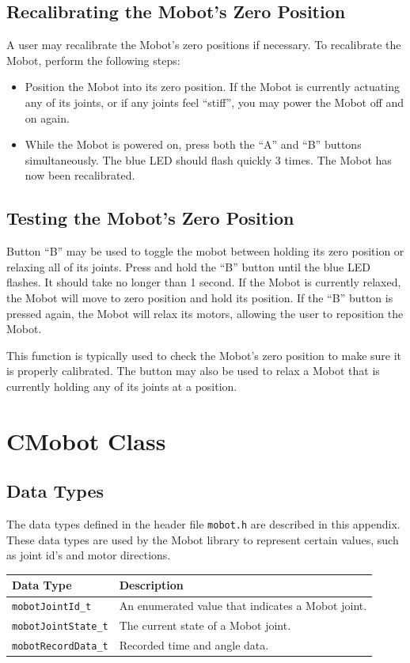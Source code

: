 \documentclass{article}
\begin{document}
\subsection{Recalibrating the Mobot's Zero Position}
A user may recalibrate the Mobot's zero positions if necessary. To recalibrate
the Mobot, perform the following steps:
\begin{itemize}
\item Position the Mobot into its zero position. If the Mobot is currently
actuating any of its joints, or if any joints feel ``stiff'', you may power the
Mobot off and on again.
\item While the Mobot is powered on, press both the ``A'' and ``B'' buttons
simultaneously. The blue LED should flash quickly 3 times. The Mobot has now
been recalibrated.
\end{itemize}

\subsection{\label{sec:zeroposition}Testing the Mobot's Zero Position}
Button ``B'' may be used to toggle the mobot between holding its zero position 
or relaxing all of its joints. Press and hold the ``B'' button until the blue
LED flashes. It should take no longer than 1 second. If the Mobot is currently relaxed,
the Mobot will move to zero position and hold its position. If the ``B'' button is pressed again, the 
Mobot will relax its motors, allowing the user to reposition the Mobot.

This function is typically used to check the Mobot's zero position to make sure
it is properly calibrated. The button may also be used to relax a Mobot that
is currently holding any of its joints at a position.

\newpage
\appendix
\section{CMobot Class}
\subsection{\label{sec:datatypes}Data Types}
The data types defined in the header file \texttt{mobot.h} are described in
this appendix.
These data types are used by the Mobot library to represent 
certain values, such as joint id's and motor directions.

\begin{tabular}{p{3.5cm}p{10cm}} \hline 
Data Type& Description \\
\hline 
\texttt{mobotJointId\_t} & An enumerated value that indicates a Mobot joint. \\
\texttt{mobotJointState\_t} & The current state of a Mobot joint. \\
\texttt{mobotRecordData\_t} & Recorded time and angle data. \\
\hline
\end{tabular}
\end{document}
